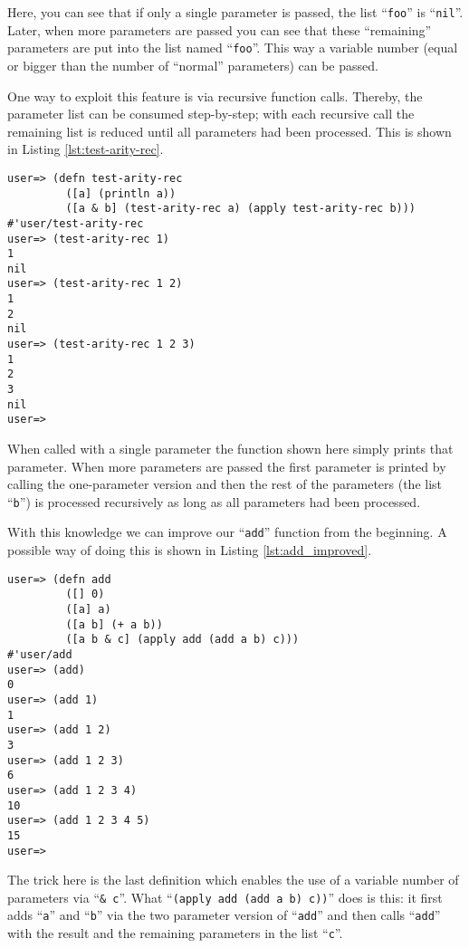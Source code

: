 Here, you can see that if only a single parameter is passed, the list ``\texttt{foo}'' is ``\texttt{nil}''.
Later, when more parameters are passed you can see that these ``remaining'' parameters are put into the list named ``\texttt{foo}''.
This way a variable number (equal or bigger than the number of ``normal'' parameters) can be passed.

One way to exploit this feature is via recursive function calls.
Thereby, the parameter list can be consumed step-by-step; with each recursive call the remaining list is reduced until all parameters had been processed.
This is shown in Listing \vref{lst:test-arity-rec}.

\begin{lstlisting}[label=lst:test-arity-rec, caption=Recursively Processing Variable Length Parameters]
user=> (defn test-arity-rec
         ([a] (println a))
         ([a & b] (test-arity-rec a) (apply test-arity-rec b)))
#'user/test-arity-rec
user=> (test-arity-rec 1)
1
nil
user=> (test-arity-rec 1 2)
1
2
nil
user=> (test-arity-rec 1 2 3)
1
2
3
nil
user=>  
\end{lstlisting}

When called with a single parameter the function shown here simply prints that parameter.
When more parameters are passed the first parameter is printed by calling the one-parameter version and then the rest of the parameters (the list ``\texttt{b}'') is processed recursively as long as all parameters had been processed.

With this knowledge we can improve our ``\texttt{add}'' function from the beginning.
A possible way of doing this is shown in Listing \vref{lst:add_improved}.

\begin{lstlisting}[label=lst:add_improved, caption=Improved ``\texttt{add}'' Function]
user=> (defn add
         ([] 0)
         ([a] a)
         ([a b] (+ a b))
         ([a b & c] (apply add (add a b) c)))
#'user/add
user=> (add)
0
user=> (add 1)
1
user=> (add 1 2)
3
user=> (add 1 2 3)
6
user=> (add 1 2 3 4)
10
user=> (add 1 2 3 4 5)
15
user=>  
\end{lstlisting}

The trick here is the last definition which enables the use of a variable number of parameters via ``\texttt{\& c}''.
What ``\texttt{(apply add (add a b) c))}'' does is this:
it first adds ``\texttt{a}'' and ``\texttt{b}'' via the two parameter version of ``\texttt{add}'' and then calls ``\texttt{add}'' with the result and the remaining parameters in the list ``\texttt{c}''.

